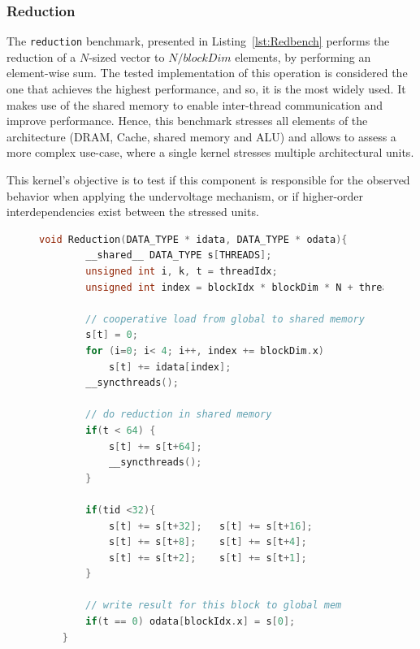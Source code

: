 \subsubsection{Reduction}

The \texttt{reduction} benchmark, presented in Listing~\ref{lst:Redbench} performs the reduction of a $N$-sized vector to $N/blockDim$ elements, by performing an element-wise sum. The tested implementation of this operation is considered the one that achieves the highest performance, and so, it is the most widely used. It makes use of the shared memory to enable inter-thread communication and improve performance. Hence, this benchmark stresses all elements of the architecture (DRAM, Cache, shared memory and ALU) and allows to assess a more complex use-case, where a single kernel stresses multiple architectural units.

This kernel's objective is to test if this component is responsible for the observed behavior when applying the undervoltage mechanism, or if higher-order interdependencies exist between the stressed units.

\begin{figure}[htb]
    \begin{lstlisting}[language=C, caption=Reduction Kernel Code, label=lst:Redbench, basicstyle=\footnotesize\ttfamily,abovecaptionskip=0pt, captionpos=b]
    void Reduction(DATA_TYPE * idata, DATA_TYPE * odata){
        __shared__ DATA_TYPE s[THREADS];
        unsigned int i, k, t = threadIdx;
        unsigned int index = blockIdx * blockDim * N + threadIdx;
        
        // cooperative load from global to shared memory
        s[t] = 0;
        for (i=0; i< 4; i++, index += blockDim.x)
            s[t] += idata[index];
        __syncthreads();
        
        // do reduction in shared memory
        if(t < 64) {
            s[t] += s[t+64]; 
            __syncthreads(); 
        }
        
        if(tid <32){
            s[t] += s[t+32];   s[t] += s[t+16];
            s[t] += s[t+8];    s[t] += s[t+4];
            s[t] += s[t+2];    s[t] += s[t+1];
        }
        
        // write result for this block to global mem
        if(t == 0) odata[blockIdx.x] = s[0];
    }
    \end{lstlisting}
\end{figure}

\newpage
